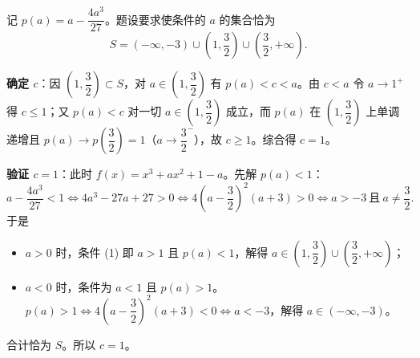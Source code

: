 \begin{answer}
记 \(p(a)=a-\dfrac{4a^{3}}{27}\)。题设要求使条件的 \(a\) 的集合恰为
\nopagebreak[4]
\[
S=(-\infty,-3)\cup\left(1,\frac{3}{2}\right)\cup\left(\frac{3}{2},+\infty\right).
\]

\textbf{确定 \(c\)}：因 \(\left(1,\dfrac{3}{2}\right)\subset S\)，对 \(a\in\left(1,\dfrac{3}{2}\right)\) 有 \(p(a)<c<a\)。由 \(c<a\) 令 \(a\to1^{+}\) 得 \(c\leqslant1\)；又 \(p(a)<c\) 对一切 \(a\in\left(1,\dfrac{3}{2}\right)\) 成立，而 \(p(a)\) 在 \(\left(1,\dfrac{3}{2}\right)\) 上单调递增且 \(p(a)\to p\left(\dfrac{3}{2}\right)=1\)（\(a\to\dfrac{3}{2}^{-}\)），故 \(c\geqslant1\)。综合得 \(c=1\)。

\textbf{验证 \(c=1\)}：此时 \(f(x)=x^{3}+ax^{2}+1-a\)。先解 \(p(a)<1\)：
\nopagebreak[4]
\[
a-\frac{4a^{3}}{27}<1\iff 4a^{3}-27a+27>0\iff 4\left(a-\frac{3}{2}\right)^{2}(a+3)>0\iff a>-3\ \text{且}\ a\ne\frac{3}{2}.
\]
于是
\begin{itemize}
\item \(a>0\) 时，条件 (1) 即 \(a>1\) 且 \(p(a)<1\)，解得 \(a\in\left(1,\dfrac{3}{2}\right)\cup\left(\dfrac{3}{2},+\infty\right)\)；
\item \(a<0\) 时，条件为 \(a<1\) 且 \(p(a)>1\)。\(p(a)>1\iff 4\left(a-\dfrac{3}{2}\right)^{2}(a+3)<0\iff a<-3\)，解得 \(a\in(-\infty,-3)\)。
\end{itemize}

合计恰为 \(S\)。所以 \(c=1\)。



\end{answer}
